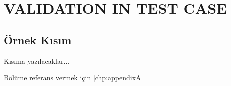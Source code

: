 \chapter{VALIDATION IN TEST CASE}
\label{chp:4}


\section{Örnek Kısım}
\label{sec:k1}

Kısıma yazılacaklar...

Bölüme referans vermek için \ref{chp:appendixA}
